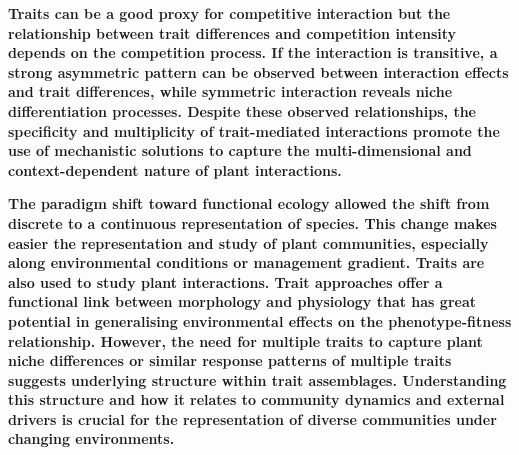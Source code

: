 









\textbf{Traits can be a good proxy for competitive interaction but the relationship between trait differences and competition intensity depends on the competition process. If the interaction is transitive, a strong asymmetric pattern can be observed between interaction effects and trait differences, while symmetric interaction reveals niche differentiation processes. Despite these observed relationships, the specificity and multiplicity of trait-mediated interactions promote the use of mechanistic solutions to capture the multi-dimensional and context-dependent nature of plant interactions.}


\textbf{The paradigm shift toward functional ecology allowed the shift from discrete to a continuous representation of species. This change makes easier the representation and study of plant communities, especially along environmental conditions or management gradient. Traits are also used to study plant interactions.  Trait approaches offer a functional link between morphology and physiology that has great potential in generalising environmental effects on the phenotype-fitness relationship. However, the need for multiple traits to capture plant niche differences or similar response patterns of multiple traits suggests underlying structure within trait assemblages. Understanding this structure and how it relates to community dynamics and external drivers is crucial for the representation of diverse communities under changing environments. } 

